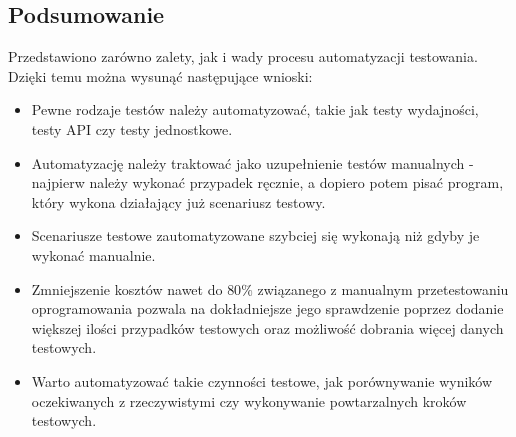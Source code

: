 \begin{df}
\begin{prz}
\begin{table}[H]
\centering
\caption{Diagram stanów dla powyższego deterministycznego automatu skończonego}
\label{my-label}
\end{table}


\end{prz}

\end{df}



\subsection{Podsumowanie}

Przedstawiono zarówno zalety, jak i wady procesu automatyzacji testowania. Dzięki temu można wysunąć następujące wnioski:
\begin{itemize}
    \item Pewne rodzaje testów należy automatyzować, takie jak testy wydajności, testy API czy testy jednostkowe.
    \item Automatyzację należy traktować jako uzupełnienie testów manualnych - najpierw należy wykonać przypadek ręcznie, a dopiero potem pisać program, który wykona działający już scenariusz testowy.
    \item Scenariusze testowe zautomatyzowane szybciej się wykonają niż gdyby je wykonać manualnie.
    \item Zmniejszenie kosztów nawet do $80\%$ związanego z manualnym przetestowaniu oprogramowania pozwala na dokładniejsze jego sprawdzenie poprzez dodanie większej ilości przypadków testowych oraz możliwość dobrania więcej danych testowych.
    \item Warto automatyzować takie czynności testowe, jak porównywanie wyników oczekiwanych z rzeczywistymi czy wykonywanie powtarzalnych kroków testowych.
\end{itemize}